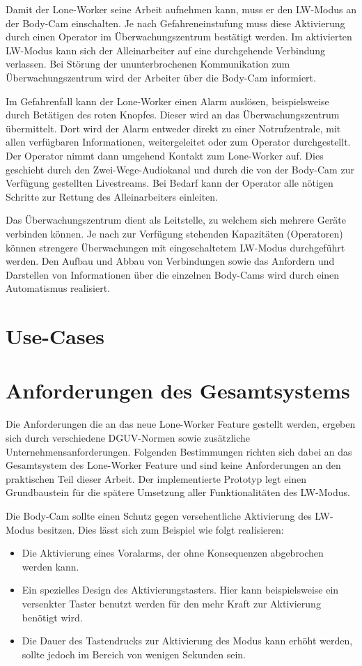 \documentclass[thesis.tex]{subfiles}
\begin{document}
Damit der Lone-Worker seine Arbeit aufnehmen kann, muss er den LW-Modus an der Body-Cam einschalten.
Je nach Gefahreneinstufung muss diese Aktivierung durch einen Operator im Überwachungszentrum bestätigt werden.
Im aktivierten LW-Modus kann sich der Alleinarbeiter auf eine durchgehende Verbindung verlassen.
Bei Störung der ununterbrochenen Kommunikation zum Überwachungszentrum wird der Arbeiter über die Body-Cam informiert.

Im Gefahrenfall kann der Lone-Worker einen Alarm auslösen, beispielsweise durch Betätigen des roten Knopfes.
Dieser wird an das Überwachungszentrum übermittelt.
Dort wird der Alarm entweder direkt zu einer Notrufzentrale, mit allen verfügbaren Informationen, weitergeleitet oder zum Operator durchgestellt.
Der Operator nimmt dann umgehend Kontakt zum Lone-Worker auf.
Dies geschieht durch den Zwei-Wege-Audiokanal und durch die von der Body-Cam zur Verfügung gestellten Livestreams.
Bei Bedarf kann der Operator alle nötigen Schritte zur Rettung des Alleinarbeiters einleiten.

Das Überwachungszentrum dient als Leitstelle, zu welchem sich mehrere Geräte verbinden können.
Je nach zur Verfügung stehenden Kapazitäten (Operatoren) können strengere Überwachungen mit eingeschaltetem LW-Modus durchgeführt werden.
Den Aufbau und Abbau von Verbindungen sowie das Anfordern und Darstellen von Informationen über die einzelnen Body-Cams wird
durch einen Automatismus realisiert.

\section{Use-Cases}
\section{Anforderungen des Gesamtsystems}
Die Anforderungen die an das neue Lone-Worker Feature gestellt werden, ergeben sich durch verschiedene DGUV-Normen sowie zusätzliche Unternehmensanforderungen.
Folgenden Bestimmungen richten sich dabei an das Gesamtsystem des Lone-Worker Feature und sind keine Anforderungen an den praktischen Teil dieser Arbeit.
Der implementierte Prototyp legt einen Grundbaustein für die spätere Umsetzung aller Funktionalitäten des LW-Modus.

Die Body-Cam sollte einen Schutz gegen versehentliche Aktivierung des LW-Modus besitzen.
Dies lässt sich zum Beispiel wie folgt realisieren:
\begin{itemize}
    \item Die Aktivierung eines Voralarms, der ohne Konsequenzen abgebrochen werden kann.
    \item Ein spezielles Design des Aktivierungstasters. Hier kann beispielsweise ein versenkter Taster benutzt werden für den mehr Kraft zur Aktivierung benötigt wird.
    \item Die Dauer des Tastendrucks zur Aktivierung des Modus kann erhöht werden, sollte jedoch im Bereich von wenigen Sekunden sein.
\end{itemize}
\end{document}
